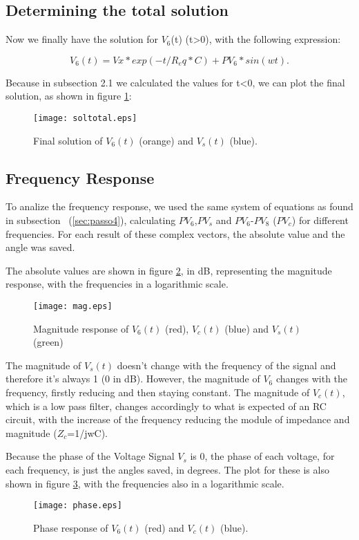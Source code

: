 \subsection{Determining the total solution}

Now we finally have the solution for $V_6$(t) (t>0), with the following expression:

\begin{equation}
  V_6(t)=Vx*exp(-t/R_eq*C)+PV_6*sin(wt).
  \label{eq:totalsol}
\end{equation}

Because in subsection 2.1 we calculated the values for t<0, we can plot the final solution, as shown in figure \ref{fig:soltotal}:

\begin{figure}[h] \centering
\texttt{[image: soltotal.eps]}
\caption{Final solution of $V_6(t)$ (orange) and $V_s(t)$ (blue).}
\label{fig:soltotal}
\end{figure}


\subsection{Frequency Response}

To analize the frequency response, we used the same system of equations as found in subsection ~(\ref{sec:passo4}), calculating $PV_6$,$PV_s$ and $PV_6$-$PV_8$ ($PV_c$) for different frequencies. For each result of these complex vectors, the absolute value and the angle was saved. 

The absolute values are shown in figure \ref{fig:mag}, in dB, representing the magnitude response, with the frequencies in a logarithmic scale.

\begin{figure}[h] \centering
\texttt{[image: mag.eps]}
\caption{Magnitude response of $V_6(t)$ (red), $V_c(t)$ (blue) and $V_s(t)$ (green)}
\label{fig:mag}
\end{figure}

The magnitude of $V_s(t)$ doesn't change with the frequency of the signal and therefore it's always 1 (0 in dB). However, the magnitude of $V_6$ changes with the frequency, firstly reducing and then staying constant. The magnitude of $V_c(t)$, which is a low pass filter, changes accordingly to what is expected of an RC circuit, with the increase of the frequency reducing the module of impedance and magnitude ($Z_c$=1/jwC).

Because the phase of the Voltage Signal $V_s$ is 0, the phase of each voltage, for each frequency, is just the angles saved, in degrees. The plot for these is also shown in figure \ref{fig:phase}, with the frequencies also in a logarithmic scale.

\begin{figure}[h] \centering
\texttt{[image: phase.eps]}
\caption{Phase response of $V_6(t)$ (red) and $V_c(t)$ (blue).}
\label{fig:phase}
\end{figure}

























